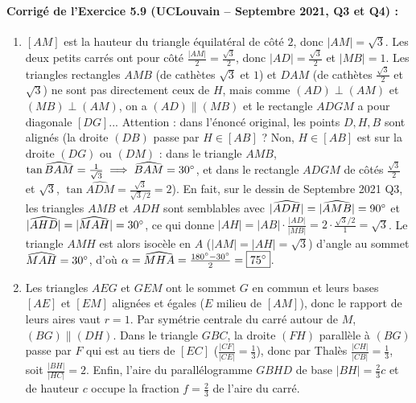 \paragraph{Corrigé de l'Exercice 5.9 (UCLouvain -- Septembre 2021, Q3 et Q4) :}
\begin{enumerate}[label=(\alph*)]
    \item $[AM]$ est la hauteur du triangle équilatéral de côté $2$, donc $|AM| = \boxed{\sqrt{3}}$. Les deux petits carrés ont pour côté $\frac{|AM|}{2} = \frac{\sqrt{3}}{2}$, donc $|AD| = \frac{\sqrt{3}}{2}$ et $|MB| = 1$. Les triangles rectangles $AMB$ (de cathètes $\sqrt{3}$ et $1$) et $DAM$ (de cathètes $\frac{\sqrt{3}}{2}$ et $\sqrt{3}$) ne sont pas directement ceux de $H$, mais comme $(AD) \perp (AM)$ et $(MB) \perp (AM)$, on a $(AD) \parallel (MB)$ et le rectangle $ADGM$ a pour diagonale $[DG]$... Attention : dans l'énoncé original, les points $D, H, B$ sont alignés (la droite $(DB)$ passe par $H \in [AB]$ ? Non, $H \in [AB]$ est sur la droite $(DG)$ ou $(DM)$ : dans le triangle $AMB$, $\tan\widehat{BAM} = \frac{1}{\sqrt{3}} \implies \widehat{BAM} = 30\degree$, et dans le rectangle $ADGM$ de côtés $\frac{\sqrt{3}}{2}$ et $\sqrt{3}$, $\tan\widehat{ADM} = \frac{\sqrt{3}}{\sqrt{3}/2} = 2$). En fait, sur le dessin de Septembre 2021 Q3, les triangles $AMB$ et $ADH$ sont semblables avec $|\widehat{ADH}| = |\widehat{AMB}| = 90\degree$ et $|\widehat{AHD}| = |\widehat{MAH}| = 30\degree$, ce qui donne $|AH| = |AB|\cdot\frac{|AD|}{|MB|} = 2\cdot\frac{\sqrt{3}/2}{1} = \boxed{\sqrt{3}}$. Le triangle $AMH$ est alors isocèle en $A$ ($|AM| = |AH| = \sqrt{3}$) d'angle au sommet $\widehat{MAH} = 30\degree$, d'où $\alpha = \widehat{MHA} = \frac{180\degree - 30\degree}{2} = \boxed{75\degree}$.
    \item Les triangles $AEG$ et $GEM$ ont le sommet $G$ en commun et leurs bases $[AE]$ et $[EM]$ alignées et égales ($E$ milieu de $[AM]$), donc le rapport de leurs aires vaut $r = \boxed{1}$. Par symétrie centrale du carré autour de $M$, $(BG) \parallel (DH)$. Dans le triangle $GBC$, la droite $(FH)$ parallèle à $(BG)$ passe par $F$ qui est au tiers de $[EC]$ ($\frac{|CF|}{|CE|} = \frac{1}{3}$), donc par Thalès $\frac{|CH|}{|CB|} = \frac{1}{3}$, soit $\frac{|BH|}{|HC|} = \boxed{2}$. Enfin, l'aire du parallélogramme $GBHD$ de base $|BH| = \frac{2}{3}c$ et de hauteur $c$ occupe la fraction $f = \boxed{\frac{2}{3}}$ de l'aire du carré.
\end{enumerate}


